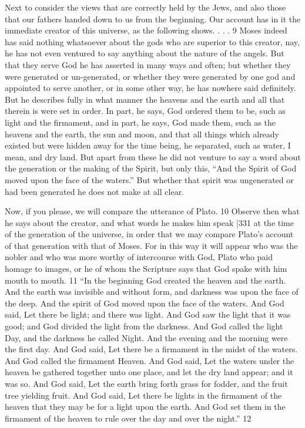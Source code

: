 Next to consider the views that are correctly held by the Jews, and also those that our fathers handed down to us from the beginning. Our account has in it the immediate creator of this universe, as the following shows. . . . 9 Moses indeed has said nothing whatsoever about the gods who are superior to this creator, nay, he has not even ventured to say anything about the nature of the angels. But that they serve God he has asserted in many ways and often; but whether they were generated or un-generated, or whether they were generated by one god and appointed to serve another, or in some other way, he has nowhere said definitely. But he describes fully in what manner the heavens and the earth and all that therein is were set in order. In part, he says, God ordered them to be, such as light and the firmament, and in part, he says, God made them, such as the heavens and the earth, the sun and moon, and that all things which already existed but were hidden away for the time being, he separated, such as water, I mean, and dry land. But apart from these he did not venture to say a word about the generation or the making of the Spirit, but only this, ``And the Spirit of God moved upon the face of the waters.'' But whether that spirit was ungenerated or had been generated he does not make at all clear.

Now, if you please, we will compare the utterance of Plato. 10 Observe then what he says about the creator, and what words he makes him speak
|331 at the time of the generation of the universe, in order that we may compare Plato's account of that generation with that of Moses. For in this way it will appear who was the nobler and who was more worthy of intercourse with God, Plato who paid homage to images, or he of whom the Scripture says that God spake with him mouth to mouth. 11 ``In the beginning God created the heaven and the earth. And the earth was invisible and without form, and darkness was upon the face of the deep. And the spirit of God moved upon the face of the waters. And God said, Let there be light; and there was light. And God saw the light that it was good; and God divided the light from the darkness. And God called the light Day, and the darkness he called Night. And the evening and the morning were the first day. And God said, Let there be a firmament in the midst of the waters. And God called the firmament Heaven. And God said, Let the waters under the heaven be gathered together unto one place, and let the dry land appear; and it was so. And God said, Let the earth bring forth grass for fodder, and the fruit tree yielding fruit. And God said, Let there be lights in the firmament of the heaven that they may be for a light upon the earth. And God set them in the firmament of the heaven to rule over the day and over the night.''
12


